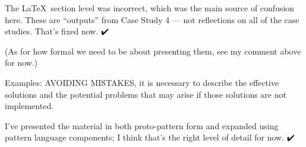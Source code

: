 \documentclass[acmlarge,timestamp]{acmart}
\begin{document}
\begin{rightbubbles}
The \LaTeX\ section level was incorrect, which was the main source of
confusion here.  These are “outputs” from Case Study 4 — not
reflections on all of the case studies.  That’s fixed now.  {\huge ✔️}

(As for how formal we need to be about presenting them, see my comment
above for now.)
\end{rightbubbles}

\begin{leftbubbles}
Examples: AVOIDING MISTAKES, it is necessary to describe the effective
solutions and the potential problems that may arise if those solutions
are not implemented.
\end{leftbubbles}

\begin{rightbubbles}
I’ve presented the material in both proto-pattern form and expanded
using pattern language components; I think that’s the right level of
detail for now. {\huge ✔️}
\end{rightbubbles}
\end{document}
